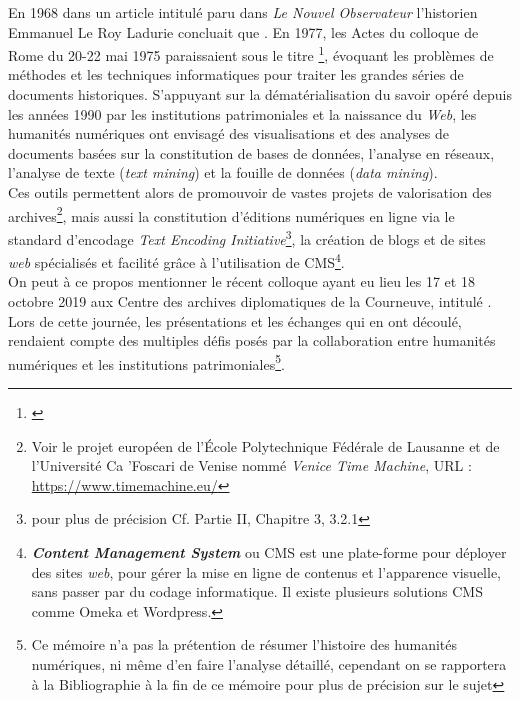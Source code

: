 En 1968 dans un article intitulé  paru dans \textit{Le Nouvel Observateur} l'historien Emmanuel Le Roy Ladurie concluait que . En 1977, les Actes du colloque de Rome du 20-22 mai 1975 paraissaient sous le titre \footnote{\cite{noauthor_informatique_1977}}, évoquant les problèmes de méthodes et les techniques informatiques pour traiter les grandes séries de documents historiques. S'appuyant sur la dématérialisation du savoir opéré depuis les années 1990 par les institutions patrimoniales et la naissance du \textit{Web}, les humanités numériques ont envisagé des visualisations et des analyses de documents basées sur la constitution de bases de données, l'analyse en réseaux, l'analyse de texte (\textit{text mining}) et la fouille de données (\textit{data mining}).\\

Ces outils permettent alors de promouvoir de vastes projets de valorisation des archives\footnote{Voir le projet européen de l'École Polytechnique Fédérale de Lausanne et de l'Université Ca 'Foscari de Venise nommé  \textit{Venice Time Machine}, URL : \url{https://www.timemachine.eu/}}, mais aussi la constitution d'éditions numériques en ligne via le standard d'encodage \textit{Text Encoding Initiative}\footnote{pour plus de précision Cf. Partie II, Chapitre 3, 3.2.1}, la création de blogs et de sites \textit{web} spécialisés et facilité grâce à l'utilisation de CMS\footnote{\textbf{\textit{Content Management System}} ou CMS est une plate-forme pour déployer des sites \textit{web}, pour gérer la mise en ligne de contenus et l'apparence visuelle, sans passer par du codage informatique. Il existe plusieurs solutions CMS comme Omeka et Wordpress.}. \\ On peut à ce propos mentionner le récent colloque ayant eu lieu les 17 et 18 octobre 2019 aux Centre des archives diplomatiques de la Courneuve, intitulé . Lors de cette journée, les présentations et les échanges qui en ont découlé, rendaient compte des multiples défis posés par la collaboration entre humanités numériques et les institutions patrimoniales\footnote{Ce mémoire n'a pas la prétention de résumer l'histoire des humanités numériques, ni même d'en faire l'analyse détaillé, cependant on se rapportera à la Bibliographie à la fin de ce mémoire pour plus de précision sur le sujet}.

